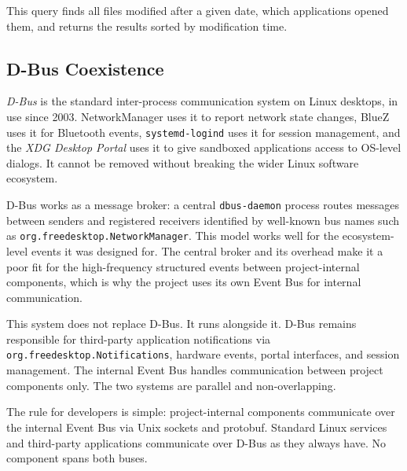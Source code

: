 This query finds all files modified after a given date, which applications
opened them, and returns the results sorted by modification time.

\subsection{D-Bus Coexistence}
\label{sec:dbus}

\emph{D-Bus} is the standard inter-process communication system on Linux
desktops, in use since 2003. NetworkManager uses it to report network state
changes, BlueZ uses it for Bluetooth events, \texttt{systemd-logind} uses it
for session management, and the \emph{XDG Desktop Portal} uses it to give
sandboxed applications access to OS-level dialogs. It cannot be removed without
breaking the wider Linux software ecosystem.

D-Bus works as a message broker: a central \texttt{dbus-daemon} process routes
messages between senders and registered receivers identified by well-known bus
names such as \texttt{org.freedesktop.NetworkManager}. This model works well for
the ecosystem-level events it was designed for. The central broker and its
overhead make it a poor fit for the high-frequency structured events between
project-internal components, which is why the project uses its own Event Bus for
internal communication.

This system does not replace D-Bus. It runs alongside it. D-Bus remains
responsible for third-party application notifications via
\texttt{org.freedesktop.Notifications}, hardware events, portal interfaces, and
session management. The internal Event Bus handles communication between
project components only. The two systems are parallel and non-overlapping.

The rule for developers is simple: project-internal components communicate over
the internal Event Bus via Unix sockets and protobuf. Standard Linux services
and third-party applications communicate over D-Bus as they always have. No
component spans both buses.
